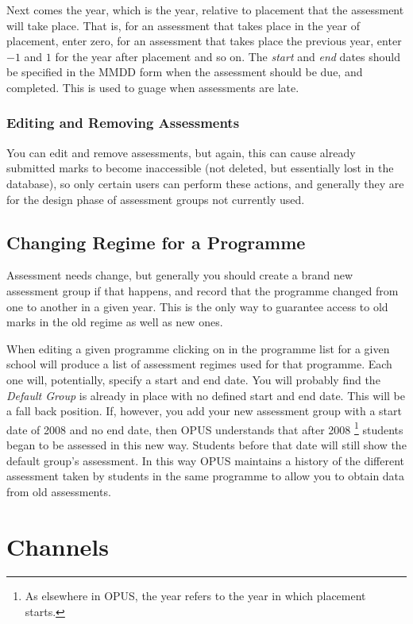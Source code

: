 \documentclass[12 pt]{book}
\begin{document}
Next comes the year, which is the year, relative to placement that the
assessment will take place. That is, for an assessment that takes place in the
year of placement, enter zero, for an assessment that takes place the previous
year, enter $-1$ and $1$ for the year after placement and so on. The
\emph{start} and \emph{end} dates should be specified in the MMDD form when
the assessment should be due, and completed. This is used to guage when 
assessments are late.

\subsubsection{Editing and Removing Assessments}

You can edit and remove assessments, but again, this can cause already submitted
marks to become inaccessible (not deleted, but essentially lost in the database),
so only certain users can perform these actions, and generally they are for the
design phase of assessment groups not currently used.

\subsection{Changing Regime for a Programme}

Assessment needs change, but generally you should create a brand new assessment
group if that happens, and record that the programme changed from one to 
another in a given year. This is the only way to guarantee access to old
marks in the old regime as well as new ones.

When editing a given programme clicking on  in the
programme list for a given school will produce a list of assessment regimes
used for that programme. Each one will, potentially, specify a start and end
date. You will probably find the \emph{Default Group} is already in place with
no defined start and end date. This will be a fall back position. If, however,
you add your new assessment group with a start date of 2008 and no end date,
then OPUS understands that after 2008%
\footnote{As elsewhere in OPUS, the year refers to the year in which placement
starts.} students began to be assessed in this new way. Students before that
date will still show the default group's assessment. In this way OPUS maintains
a history of the different assessment taken by students in the same programme
to allow you to obtain data from old assessments.

\section{Channels}
\label{Channels}
\end{document}
